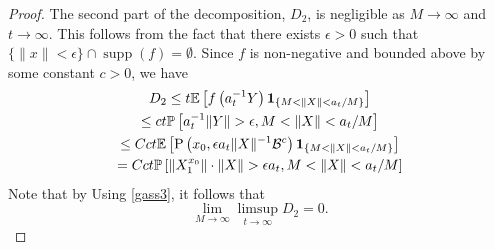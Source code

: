 \documentclass[preprint,12pt]{elsarticle}
\theoremstyle{definition}
\theoremstyle{remark}
\newcommand{\xbf}{{ x}}
\newcommand{\Xbf}{{ X}}
\newcommand{\Ybf}{{ Y}}
\newcommand{\1}{{\mathbf 1}}
\numberwithin{equation}{section}
\newcommand{\Ebb}{\mathbb{E}}  %
\newcommand{\Pbb}{\mathbb{P}}
\newcommand{\Prm}{{\rm P}}
\begin{document}
\begin{proof}
    The second part of the decomposition, $D_2$, 
    is negligible as $M \to \infty$ and $t \to \infty$. 
    This follows from the fact that there exists $\epsilon > 0$ such that  
    $\{\|\xbf\| < \epsilon\} \cap \operatorname{supp}(f) = \emptyset$.  
    Since $f$ is non-negative and bounded above by some constant $c > 0$, we have  
    \begin{multline*}  
      D_2 \leq t \Ebb \left[f\left(a_t^{-1} \Ybf\right) \1_{\{M < \|\Xbf\| < a_t / M\}}\right]\\
      \leq c t \Pbb\left[a_t^{-1} \|\Ybf\| > \epsilon, M < \|\Xbf\| < a_t / M\right]\\
      \leq C c t \Ebb \left[ \Prm\left(x_0, \epsilon a_t \|\Xbf\|^{-1}\mathcal{B}^c \right) \1_{\{M < \|\Xbf\| < a_t / M\}}\right]\\
      = C c t \Pbb\left[ \|X_1^{x_0}\| \cdot \|X\| > \epsilon a_t, M < \|\Xbf\| < a_t / M\right]
    \end{multline*}
    Note that by 
    Using \eqref{gass3}, it follows that  
    \begin{equation*}  
      \lim_{M \to \infty} \limsup_{t \to \infty} D_2 = 0.  
    \end{equation*}  


\end{proof}
\end{document}
